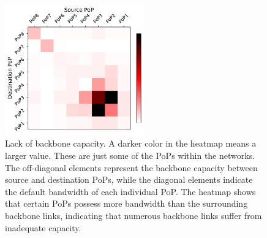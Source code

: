 \begin{figure}
	\centering
	\includegraphics[width = 6cm]{figs/implement/bandwidth-heatmap.pdf}
	\caption{\small Lack of backbone capacity. A darker color in the heatmap means a larger value. These are just some of the PoPs within the networks. The off-diagonal elements represent the backbone capacity between source and destination PoPs, while the diagonal elements indicate the default bandwidth of each individual PoP. The heatmap shows that certain PoPs possess more bandwidth than the surrounding backbone links, indicating that numerous backbone links suffer from inadequate capacity.}
	\label{fig:backbone-lack}
\end{figure}


